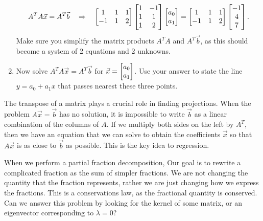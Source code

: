\begin{problem}
\begin{enumerate}
  $$A^TA\vec x=A^T\vec b \quad \Rightarrow \quad \begin{bmatrix} 1&1&1\\-1&1&2 \end{bmatrix}\begin{bmatrix} 1&-1\\1&1\\1&2 \end{bmatrix}\begin{bmatrix} a_0\\a_1 \end{bmatrix}=\begin{bmatrix} 1&1&1\\-1&1&2 \end{bmatrix}\begin{bmatrix} -1\\4\\7 \end{bmatrix}.$$ 
Make sure you simplify the matrix products $A^TA$ and $A^T\vec b$, as this should become a system of 2 equations and 2 unknowns. 
  \item Now solve $A^TA\vec x = A^T\vec b$ for $\vec x = \begin{bmatrix} a_0\\a_1 \end{bmatrix}$. Use your answer to state the line  $y=a_0 +a_1x$ that passes nearest these three points. 
 \end{enumerate}
\end{problem}
 
 The transpose of a matrix plays a crucial role in finding projections. When the problem $A\vec x =\vec b$ has no solution, it is impossible to write $\vec b$ as a linear combination of the columns of $A$.  If we multiply both sides on the left by $A^T$, then we have an equation that we can solve to obtain the coefficients $\vec x$ so that $A\vec x$ is as close to $\vec b$ as possible. This is the key idea to regression. 







 
 
 


\mysubsection{\ideacon}
When we perform a partial fraction decomposition, Our goal is to rewrite a complicated fraction as the sum of simpler fractions.  We are not changing the quantity that the fraction represents, rather we are just changing how we express the fractions.  This is a conservations law, as the fractional quantity is conserved.  Can we answer this problem by looking for the kernel of some matrix, or an eigenvector corresponding to $\lambda=0$?

